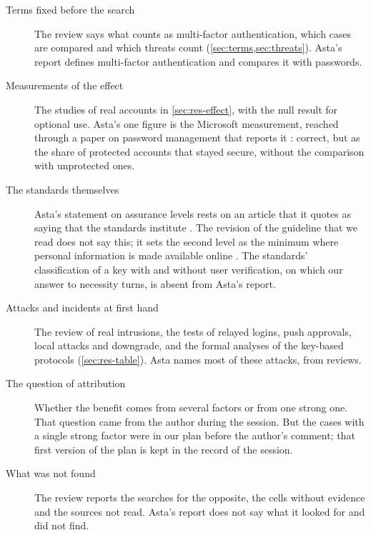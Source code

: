 \begin{refsection}
\begin{description}
  \item[Terms fixed before the search] The review says what counts as
    multi-factor authentication, which cases are compared and which
    threats count (\cref{sec:terms,sec:threats}).
    Asta's report defines multi-factor authentication and compares it
    with passwords.
  \item[Measurements of the effect] The studies of real accounts in
    \cref{sec:res-effect}, with the null result for optional use.
    Asta's one figure is the Microsoft measurement, reached through a
    paper on password management that reports it
    \autocite{Ngandu2025PasswordManagement}: correct, but as the share
    of protected accounts that stayed secure, without the comparison
    with unprotected ones.
  \item[The standards themselves] Asta's statement on assurance levels
    rests on an article that it quotes as saying that the standards
    institute
    .
    The revision of the guideline that we read does not say this; it
    sets the second level as the minimum where personal information is
    made available online \autocite[sec.~2]{NIST2025SP80063B}.
    The standards' classification of a key with and without user
    verification, on which our answer to necessity turns, is absent
    from Asta's report.
  \item[Attacks and incidents at first hand] The review of real
    intrusions, the tests of relayed logins, push approvals, local
    attacks and downgrade, and the formal analyses of the key-based
    protocols (\cref{sec:res-table}).
    Asta names most of these attacks, from reviews.
  \item[The question of attribution] Whether the benefit comes from
    several factors or from one strong one.
    That question came from the author during the session.
    But the cases with a single strong factor were in our plan before
    the author's comment; that first version of the plan is kept in the
    record of the session.
  \item[What was not found] The review reports the searches for the
    opposite, the cells without evidence and the sources not read.
    Asta's report does not say what it looked for and did not find.
\end{description}


\end{refsection}
